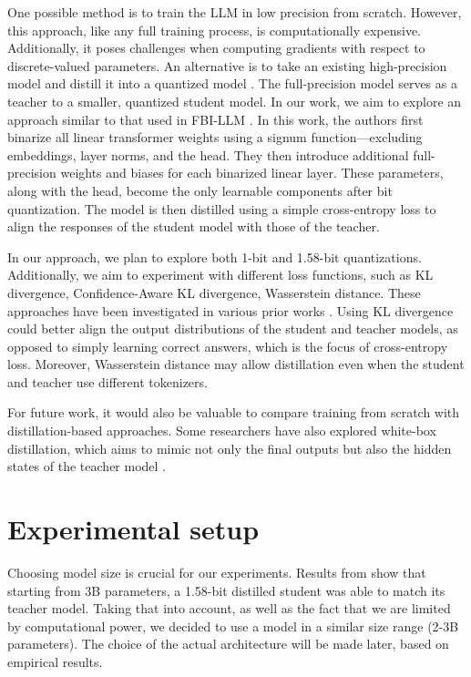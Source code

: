 \documentclass{article}
\begin{document}
One possible method is to train the LLM in low precision from scratch. However, this approach, like any full training process, is
computationally expensive. Additionally, it poses challenges when computing gradients with respect to discrete-valued parameters.
An alternative is to take an existing high-precision model and distill it into a quantized model
\cite{du2024bitdistillerunleashingpotentialsub4bit}. The full-precision model serves as a teacher to a smaller, quantized student model. 
In our work, we aim to explore an approach similar to that used in FBI-LLM \cite{fbillm}. In this work, the authors first binarize all 
linear transformer weights using a signum function—excluding embeddings, layer norms, and the head. They then introduce additional 
full-precision weights and biases for each binarized linear layer. These parameters, along with the head, become the only learnable 
components after bit quantization. The model is then distilled using a simple cross-entropy loss to align the responses of the student 
model with those of the teacher.

In our approach, we plan to explore both 1-bit and 1.58-bit quantizations. Additionally, we aim to experiment with different loss 
functions, such as KL divergence, Confidence-Aware KL divergence, Wasserstein distance. These approaches have been investigated in various
prior works \cite{du2024bitdistillerunleashingpotentialsub4bit, boizard2025crosstokenizerdistillationuniversallogit}. Using KL divergence 
could better align the output distributions of the student and teacher models, as opposed to simply learning correct answers, which is 
the focus of cross-entropy loss. Moreover, Wasserstein distance may allow distillation even when the student and teacher use different tokenizers.

For future work, it would also be valuable to compare training from scratch with distillation-based approaches. Some researchers 
have also explored white-box distillation, which aims to mimic not only the final outputs but also the hidden states of the teacher 
model \cite{gu2024minillmknowledgedistillationlarge}.

\section{Experimental setup}

Choosing model size is crucial for our experiments. Results from \cite{ma2024era1bitllmslarge} show that starting from 3B parameters, a 1.58-bit distilled student was able to match its teacher model. Taking that into account, as well as the fact that we are limited by computational power, we decided to use a model in a similar size range (2-3B parameters). The choice of the actual architecture will be made later, based on empirical results.
\end{document}
